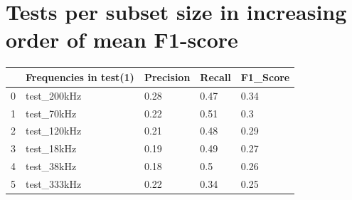 \section{Tests per subset size in increasing order of mean F1-score} \label{test_per_freq_f1_appendix}

\begin{longtable}{lllll}
\hline
\multicolumn{1}{|l|}{} & \multicolumn{1}{l|}{Frequencies in test(1)} & \multicolumn{1}{l|}{Precision} & \multicolumn{1}{l|}{Recall} & \multicolumn{1}{l|}{F1\_Score} \\ \hline
\endfirsthead
%
\endhead
%
\hline
\endfoot
%
\endlastfoot
%
0                      & test\_200kHz                                & 0.28                           & 0.47                        & 0.34                           \\
1                      & test\_70kHz                                 & 0.22                           & 0.51                        & 0.3                            \\
2                      & test\_120kHz                                & 0.21                           & 0.48                        & 0.29                           \\
3                      & test\_18kHz                                 & 0.19                           & 0.49                        & 0.27                           \\
4                      & test\_38kHz                                 & 0.18                           & 0.5                         & 0.26                           \\
5                      & test\_333kHz                                & 0.22                           & 0.34                        & 0.25                           \\ \hline
\end{longtable}
